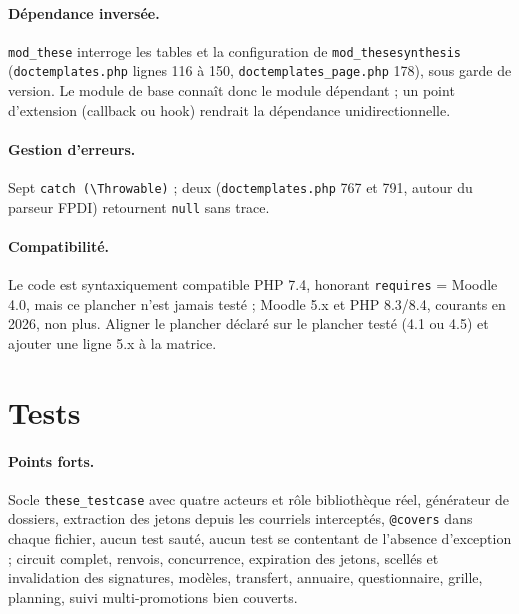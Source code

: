 \documentclass[11pt,a4paper]{article}
\newcommand{\fichier}[1]{\texttt{\small #1}}
\newcommand{\code}[1]{\texttt{#1}}
\begin{document}
\paragraph{Dépendance inversée.}
\code{mod\_these} interroge les tables et la configuration de \code{mod\_thesesynthesis}
(\fichier{doctemplates.php} lignes 116 à 150, \fichier{doctemplates\_page.php} 178), sous garde
de version. Le module de base connaît donc le module dépendant ; un point d'extension (callback
ou hook) rendrait la dépendance unidirectionnelle.

\paragraph{Gestion d'erreurs.}
Sept \code{catch (\textbackslash Throwable)} ; deux (\fichier{doctemplates.php} 767 et 791,
autour du parseur FPDI) retournent \code{null} sans trace.

\paragraph{Compatibilité.}
Le code est syntaxiquement compatible PHP 7.4, honorant \code{requires} = Moodle 4.0, mais ce
plancher n'est jamais testé ; Moodle 5.x et PHP 8.3/8.4, courants en 2026, non plus. Aligner le
plancher déclaré sur le plancher testé (4.1 ou 4.5) et ajouter une ligne 5.x à la matrice.

\section{Tests}

\paragraph{Points forts.}
Socle \code{these\_testcase} avec quatre acteurs et rôle bibliothèque réel, générateur de
dossiers, extraction des jetons depuis les courriels interceptés, \code{@covers} dans chaque
fichier, aucun test sauté, aucun test se contentant de l'absence d'exception ; circuit complet,
renvois, concurrence, expiration des jetons, scellés et invalidation des signatures, modèles,
transfert, annuaire, questionnaire, grille, planning, suivi multi-promotions bien couverts.
\end{document}
